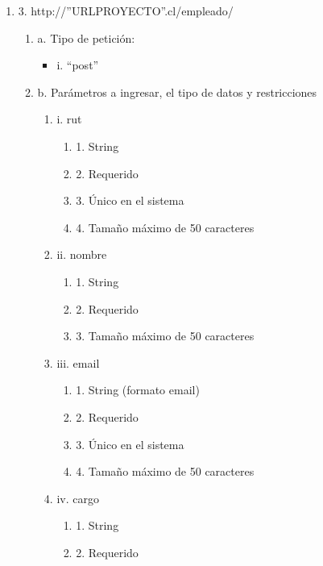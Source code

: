 \begin{enumerate}
    \item 3. http://”URLPROYECTO”.cl/empleado/
    \begin{enumerate}
        \item a. Tipo de petición:
            \begin{itemize}
               \item i. “post”
            \end{itemize}
        \item b. Parámetros a ingresar, el tipo de datos y restricciones
            \begin{enumerate}
                \item i. rut
                    \begin{enumerate}
                        \item 1. String
                        \item 2. Requerido
                        \item 3. Único en el sistema
                        \item 4. Tamaño máximo de 50 caracteres
                    \end{enumerate}
                \item ii. nombre
                    \begin{enumerate}
                        \item 1. String
                        \item 2. Requerido
                        \item 3. Tamaño máximo de 50 caracteres
                    \end{enumerate}
                \item iii. email
                    \begin{enumerate}
                        \item 1. String (formato email)
                        \item 2. Requerido
                        \item 3. Único en el sistema
                        \item 4. Tamaño máximo de 50 caracteres
                    \end{enumerate}
                \item iv. cargo
                    \begin{enumerate}
                        \item 1. String
                        \item 2. Requerido

\end{enumerate}
\end{enumerate}
\end{enumerate}
\end{enumerate}
